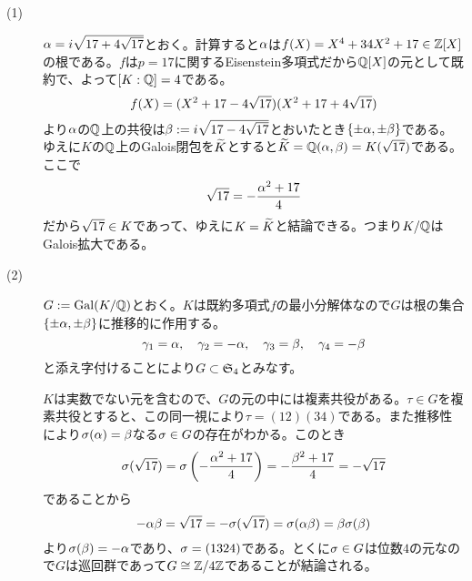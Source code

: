 \newpage


\subsubsection{}%
\begin{sol} ${}$
  \begin{description}
    \item[(1)] ${\alpha} = i \sqrt{17 + 4 \sqrt{17}} $とおく。計算すると${\alpha}$は$f(X) = X^4 + 34X^2 + 17 \in {\mathbb Z}[X]$の根である。$f$は$p=17$に関するEisenstein多項式だから${\mathbb Q}[X]$の元として既約で、よって$[K:{\mathbb Q}] = 4$である。
    \[
    f(X) = (X^2 + 17 - 4\sqrt{17})(X^2 + 17 + 4\sqrt{17})
    \]
    より${\alpha}$の${\mathbb Q}$上の共役は$\beta := i \sqrt{ 17 - 4\sqrt{17} }$とおいたとき$\{ \pm {\alpha}, \pm \beta \}$である。ゆえに$K$の${\mathbb Q}$上のGalois閉包を$\widetilde{K}$とすると$\widetilde{K}= {\mathbb Q}({\alpha}, \beta) = K(\sqrt{17})$である。ここで
    \[
    \sqrt{17} = - \frac{ {\alpha}^2 + 17 }{ 4 }
    \]
    だから$\sqrt{17} \in K$であって、ゆえに$K = \widetilde{K}$と結論できる。つまり$K/{\mathbb Q}$はGalois拡大である。
    \item[(2)] $G := \operatorname{Gal}(K/{\mathbb Q})$とおく。$K$は既約多項式$f$の最小分解体なので$G$は根の集合$\{ \pm {\alpha}, \pm \beta \}$に推移的に作用する。
    \[
    {\gamma}_1 = {\alpha} , \quad {\gamma}_2 = - {\alpha}, \quad {\gamma}_3 = \beta , \quad {\gamma}_4 = - \beta
    \]
    と添え字付けることにより$G \subset \mathfrak{S}_4$とみなす。

    $K$は実数でない元を含むので、$G$の元の中には複素共役がある。$\tau \in G$を複素共役とすると、この同一視により$\tau = (12)(34)$である。また推移性により${\sigma} ({\alpha}) = \beta$なる${\sigma} \in G$の存在がわかる。このとき
    \[
    {\sigma}(\sqrt{17}) = {\sigma} \left( - \frac{ {\alpha}^2 + 17 }{ 4 }  \right) = - \frac{ \beta^2 + 17 }{ 4 } = - \sqrt{17}
    \]
    であることから
    \[
    - {\alpha} \beta = \sqrt{17} = - {\sigma}(\sqrt{17}) = {\sigma}( {\alpha} \beta) = \beta {\sigma}( \beta )
    \]
    より${\sigma}(\beta) = - {\alpha}$であり、${\sigma} = (1324)$である。とくに${\sigma} \in G$は位数$4$の元なので$G$は巡回群であって$G \cong \mathbb{Z} / 4 \mathbb{Z}$であることが結論される。
  \end{description}
\end{sol}

